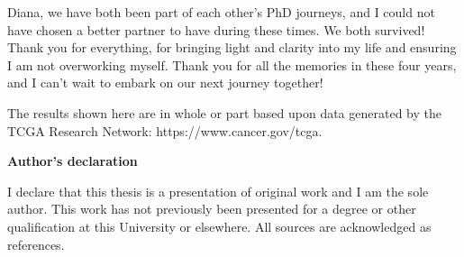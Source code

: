 Diana, we have both been part of each other's PhD journeys, and I could not have chosen a better partner to have during these times. We both survived! Thank you for everything, for bringing light and clarity into my life and ensuring I am not overworking myself. Thank you for all the memories in these four years, and I can't wait to embark on our next journey together!


The results shown here are in whole or part based upon data generated by the TCGA Research Network: https://www.cancer.gov/tcga.










\newpage 

\thispagestyle{plain}
\begin{center}
    \Large        
    \textbf{Author's declaration}
    \vspace{0.9cm}

\end{center}


I declare that this thesis is a presentation of original work and I am the sole author. This work has not previously been presented for a degree or other qualification at this University or elsewhere. All sources are acknowledged as references.
